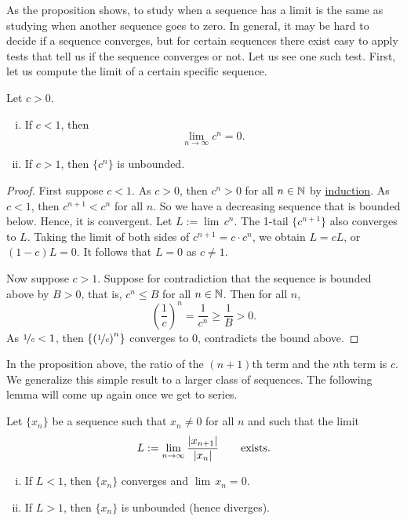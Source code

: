 As the proposition shows, to study when a sequence has a limit is 
the same as studying when another sequence goes to zero.
In general, it may be hard to decide if a sequence converges, but
for certain sequences there exist easy to apply tests that tell us
if the sequence converges or not.  Let us see one such test.
First, let
us compute the limit of a certain specific sequence.
\begin{prop}
Let $c > 0$.
\begin{enumerate}[(i)]
\item
If $c < 1$, then
\begin{equation*}
\lim_{n\to\infty} c^n = 0.
\end{equation*}
\item
If $c > 1$, then $\{ c^n \}$ is unbounded.
\end{enumerate}
\end{prop}

\begin{proof}
First suppose $c < 1$.  As $c > 0$, then $c^n > 0$ for all $n \in {\mathbb{N}}$ by
\hyperref[induction:thm]{induction}.  As $c < 1$, then $c^{n+1} < c^n$ for all $n$.  So we have
a decreasing sequence that is bounded below.  Hence, it is convergent.
Let $L := \lim\, c^n$.  The 1-tail $\{ c^{n+1} \}$
also converges to $L$.  Taking the limit of both sides of $c^{n+1} = c \cdot
c^n$, we obtain $L = cL$, or $(1-c)L=0$.  It follows that $L=0$ as $c \not= 1$.

Now suppose $c > 1$. Suppose for contradiction that the sequence is bounded above by $B > 0$, that is,
$c^n \leq B$ for all $n \in {\mathbb{N}}$.  Then for all $n$,
\begin{equation*}
{\left(\frac{1}{c}\right)}^n = \frac{1}{c^n} \geq \frac{1}{B} > 0 .
\end{equation*}
As $\nicefrac{1}{c} < 1$, then $\{ {(\nicefrac{1}{c})}^n \}$
converges to 0, contradicts the bound above.
\end{proof}

In the proposition above, the
ratio of the $(n+1)$th term and the $n$th term is $c$.  We 
generalize this simple result to a larger class of sequences.
The following lemma will come up again once we get to series.

\begin{lemma}
\label{seq:ratiotest}
Let $\{ x_n \}$ be a sequence such that $x_n \not= 0$ for all $n$ and such that
the limit
\begin{equation*}
L := \lim_{n\to\infty} \frac{\left\lvert {x_{n+1}} \right\rvert}{\left\lvert {x_n} \right\rvert}
\qquad
\text{exists.}
\end{equation*}
\begin{enumerate}[(i)]
\item
If $L < 1$, then $\{ x_n \}$ converges and $\lim\, x_n = 0$.
\item
If $L > 1$, then $\{ x_n \}$ is unbounded (hence diverges).
\end{enumerate}
\end{lemma}

